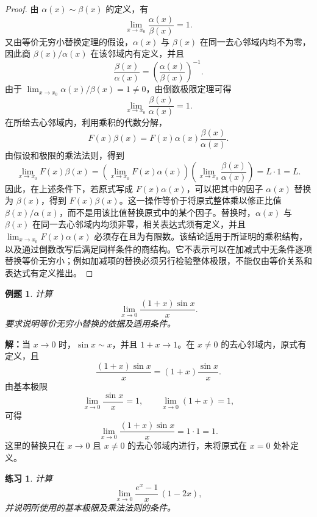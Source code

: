 \documentclass[UTF8,fontset=fandol,11pt]{ctexart}
\newtheorem{example}[definition]{例题}
\newtheorem{exercise}[definition]{练习}
\begin{document}
\begin{proof}
由 $\alpha(x)\sim\beta(x)$ 的定义，有
\[
\lim_{x\to x_0}\frac{\alpha(x)}{\beta(x)}=1.
\]
又由等价无穷小替换定理的假设，$\alpha(x)$ 与 $\beta(x)$ 在同一去心邻域内均不为零，因此商 $\beta(x)/\alpha(x)$ 在该邻域内有定义，并且
\[
\frac{\beta(x)}{\alpha(x)}
=\left(\frac{\alpha(x)}{\beta(x)}\right)^{-1}.
\]
由于 $\lim_{x\to x_0}\alpha(x)/\beta(x)=1\neq0$，由倒数极限定理可得
\[
\lim_{x\to x_0}\frac{\beta(x)}{\alpha(x)}=1.
\]
在所给去心邻域内，利用乘积的代数分解，
\[
F(x)\beta(x)=F(x)\alpha(x)\frac{\beta(x)}{\alpha(x)}.
\]
由假设和极限的乘法法则，得到
\[
\lim_{x\to x_0}F(x)\beta(x)
=\left(\lim_{x\to x_0}F(x)\alpha(x)\right)
\left(\lim_{x\to x_0}\frac{\beta(x)}{\alpha(x)}\right)
=L\cdot1=L.
\]
因此，在上述条件下，若原式写成 $F(x)\alpha(x)$，可以把其中的因子 $\alpha(x)$ 替换为 $\beta(x)$，得到 $F(x)\beta(x)$。这一操作等价于将原式整体乘以修正比值 $\beta(x)/\alpha(x)$，而不是用该比值替换原式中的某个因子。替换时，$\alpha(x)$ 与 $\beta(x)$ 在同一去心邻域内均须非零，相关表达式须有定义，并且 $\lim_{x\to x_0}F(x)\alpha(x)$ 必须存在且为有限数。该结论适用于所证明的乘积结构，以及通过倒数改写后满足同样条件的商结构。它不表示可以在加减式中无条件逐项替换等价无穷小；例如加减项的替换必须另行检验整体极限，不能仅由等价关系和表达式有定义推出。
\end{proof}
\begin{example}
计算
\[
\lim_{x\to0}\frac{(1+x)\sin x}{x}.
\]
要求说明等价无穷小替换的依据及适用条件。
\end{example}
\par\noindent\textbf{解：}当 $x\to0$ 时，$\sin x\sim x$，并且 $1+x\to1$。在 $x\neq0$ 的去心邻域内，原式有定义，且
\[
\frac{(1+x)\sin x}{x}=(1+x)\frac{\sin x}{x}.
\]
由基本极限
\[
\lim_{x\to0}\frac{\sin x}{x}=1,
\qquad
\lim_{x\to0}(1+x)=1,
\]
可得
\[
\lim_{x\to0}\frac{(1+x)\sin x}{x}=1\cdot1=1.
\]
这里的替换只在 $x\to0$ 且 $x\neq0$ 的去心邻域内进行，未将原式在 $x=0$ 处补定义。\par
\begin{exercise}
\label{mathagent:exercise:410f498083ff9a28d1a2acf9839e74554b434d3445561642fdfe5d3854f06971}
计算
\[
\lim_{x\to0}\frac{e^x-1}{x}\,(1-2x),
\]
并说明所使用的基本极限及乘法法则的条件。
\end{exercise}
\end{document}
